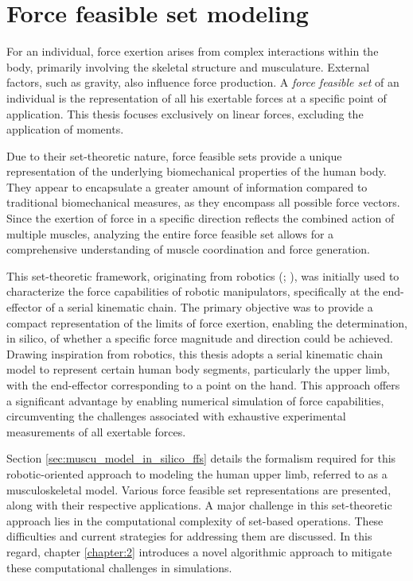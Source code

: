 \chapter{Force feasible set modeling}
\label{chapter:1}

For an individual, force exertion arises from complex interactions within the body, primarily involving the skeletal structure and musculature.  External factors, such as gravity, also influence force production. A \emph{force feasible set} of an individual is the representation of all his exertable forces at a specific point of application. This thesis focuses exclusively on linear forces, excluding the application of moments.

Due to their set-theoretic nature, force feasible sets provide a unique representation of the underlying biomechanical properties of the human body. They appear to encapsulate a greater amount of information compared to traditional biomechanical measures, as they encompass all possible force vectors. Since the exertion of force in a specific direction reflects the combined action of multiple muscles, analyzing the entire force feasible set allows for a comprehensive understanding of muscle coordination and force generation.

This set-theoretic framework, originating from robotics (\cite{yoshikawaManipulabilityRoboticMechanisms1985}; \cite{chiacchioForcePolytopeForce1997}), was initially used to characterize the force capabilities of robotic manipulators, specifically at the end-effector of a serial kinematic chain. The primary objective was to provide a compact representation of the limits of force exertion, enabling the determination, in silico, of whether a specific force magnitude and direction could be achieved. Drawing inspiration from robotics, this thesis adopts a serial kinematic chain model to represent certain human body segments, particularly the upper limb, with the end-effector corresponding to a point on the hand. This approach offers a significant advantage by enabling numerical simulation of force capabilities, circumventing the challenges associated with exhaustive experimental measurements of all exertable forces.

Section \ref{sec:muscu_model_in_silico_ffs} details the formalism required for this robotic-oriented approach to modeling the human upper limb, referred to as a musculoskeletal model. Various force feasible set representations are presented, along with their respective applications.  A major challenge in this set-theoretic approach lies in the computational complexity of set-based operations. These difficulties and current strategies for addressing them are discussed. In this regard, chapter \ref{chapter:2} introduces a novel algorithmic approach to mitigate these computational challenges in simulations.

